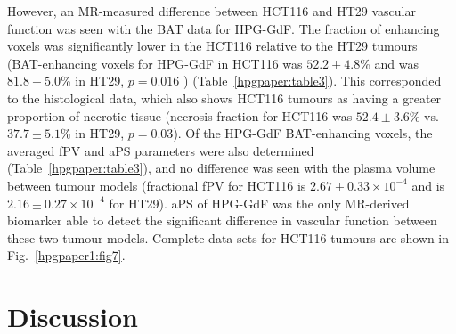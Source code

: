However, an MR-measured difference between HCT116 and HT29 vascular function was seen with the \acs{BAT} data for \acs{HPG-GdF}.
The fraction of enhancing voxels was significantly lower in the HCT116 relative to the HT29 tumours (BAT-enhancing voxels for \acs{HPG-GdF} in HCT116 was $52.2\pm 4.8$\% and was $81.8\pm 5.0$\% in HT29, $p=0.016$ ) (Table~\ref{hpgpaper:table3}).
This corresponded to the histological data, which also shows HCT116 tumours as having a greater proportion of necrotic tissue (necrosis fraction for HCT116 was $52.4\pm 3.6$\% vs. $37.7\pm 5.1$\% in HT29, $p=0.03$).
Of the \acs{HPG-GdF} \acs{BAT}-enhancing voxels, the averaged \acs{fPV} and \acs{aPS} parameters were also determined (Table~\ref{hpgpaper:table3}), and no difference was seen with the plasma volume between tumour models (fractional \acs{fPV} for HCT116 is $2.67\pm 0.33\times10^{-4}$ and is $2.16\pm 0.27 \times10^{-4}$ for HT29).
\acs{aPS} of \acs{HPG-GdF} was the only MR-derived biomarker able to detect the significant difference in vascular function between these two tumour models.
Complete data sets for HCT116 tumours are shown in Fig.~\ref{hpgpaper1:fig7}.

\section{Discussion}

